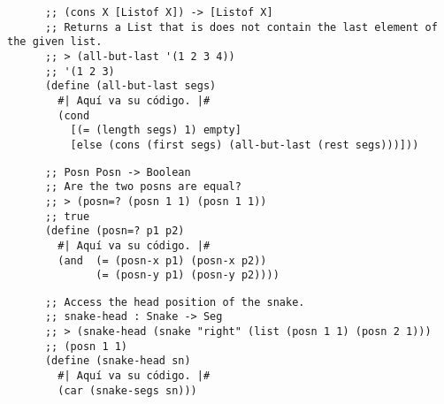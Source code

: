 \documentclass[answers]{exam}
\begin{document}
\begin{questions}
  \begin{solution}
    \begin{verbatim}
      ;; (cons X [Listof X]) -> [Listof X]
      ;; Returns a List that is does not contain the last element of the given list.
      ;; > (all-but-last '(1 2 3 4))
      ;; '(1 2 3)
      (define (all-but-last segs)
        #| Aquí va su código. |# 
        (cond 
          [(= (length segs) 1) empty]
          [else (cons (first segs) (all-but-last (rest segs)))]))
    \end{verbatim}
  \end{solution}


  \begin{solution}
    \begin{verbatim}
      ;; Posn Posn -> Boolean
      ;; Are the two posns are equal?
      ;; > (posn=? (posn 1 1) (posn 1 1))
      ;; true
      (define (posn=? p1 p2)
        #| Aquí va su código. |#
        (and  (= (posn-x p1) (posn-x p2))
              (= (posn-y p1) (posn-y p2))))
    \end{verbatim}
  \end{solution}
  
  \begin{solution}
    \begin{verbatim}
      ;; Access the head position of the snake.
      ;; snake-head : Snake -> Seg
      ;; > (snake-head (snake "right" (list (posn 1 1) (posn 2 1)))
      ;; (posn 1 1)
      (define (snake-head sn)
        #| Aquí va su código. |#
        (car (snake-segs sn)))
    \end{verbatim}
  \end{solution}
  

\end{questions}
\end{document}
